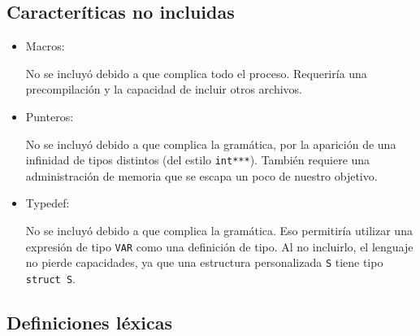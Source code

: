 \documentclass[12pt]{article}
\begin{document}
\subsection*{Caracter\'iticas no incluidas}
\begin{itemize}
    \item Macros:

    No se incluy\'o debido a que complica todo el proceso. Requerir\'ia una precompilaci\'on y la capacidad de incluir otros archivos.
    \item Punteros:

    No se incluy\'o debido a que complica la gram\'atica, por la aparici\'on de una infinidad de tipos distintos (del estilo \texttt{int***}). Tambi\'en requiere una administraci\'on de memoria que se escapa un poco de nuestro objetivo.

    \item Typedef:

    No se incluy\'o debido a que complica la gram\'atica. Eso permitir\'ia utilizar una expresi\'on de tipo \texttt{VAR} como una definici\'on de tipo. Al no incluirlo, el lenguaje no pierde capacidades, ya que una estructura personalizada \texttt{S} tiene tipo \texttt{struct S}.
\end{itemize}

\subsection*{Definiciones l\'exicas}
\end{document}
